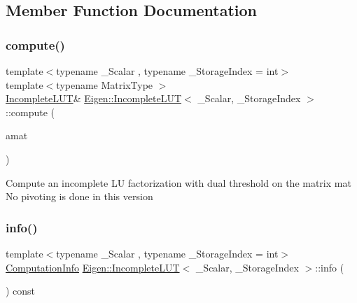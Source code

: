 \subsection{Member Function Documentation}
\mbox{\label{class_eigen_1_1_incomplete_l_u_t_a488e37ab51d8ed37a297eeca521f1817}} 
\subsubsection{\texorpdfstring{compute()}{compute()}}
{\footnotesize\ttfamily template$<$typename \+\_\+\+Scalar , typename \+\_\+\+Storage\+Index  = int$>$ \\
template$<$typename Matrix\+Type $>$ \\
\mbox{\hyperlink{class_eigen_1_1_incomplete_l_u_t}{Incomplete\+L\+UT}}\& \mbox{\hyperlink{class_eigen_1_1_incomplete_l_u_t}{Eigen\+::\+Incomplete\+L\+UT}}$<$ \+\_\+\+Scalar, \+\_\+\+Storage\+Index $>$\+::compute (\begin{DoxyParamCaption}\item[{const Matrix\+Type \&}]{amat }\end{DoxyParamCaption})\hspace{0.3cm}{\ttfamily [inline]}}

Compute an incomplete LU factorization with dual threshold on the matrix mat No pivoting is done in this version \mbox{\label{class_eigen_1_1_incomplete_l_u_t_a941c7d34f15d7bc287e780636be0ee2b}} 
\subsubsection{\texorpdfstring{info()}{info()}}
{\footnotesize\ttfamily template$<$typename \+\_\+\+Scalar , typename \+\_\+\+Storage\+Index  = int$>$ \\
\mbox{\hyperlink{group__enums_ga85fad7b87587764e5cf6b513a9e0ee5e}{Computation\+Info}} \mbox{\hyperlink{class_eigen_1_1_incomplete_l_u_t}{Eigen\+::\+Incomplete\+L\+UT}}$<$ \+\_\+\+Scalar, \+\_\+\+Storage\+Index $>$\+::info (\begin{DoxyParamCaption}{ }\end{DoxyParamCaption}) const\hspace{0.3cm}{\ttfamily [inline]}}



